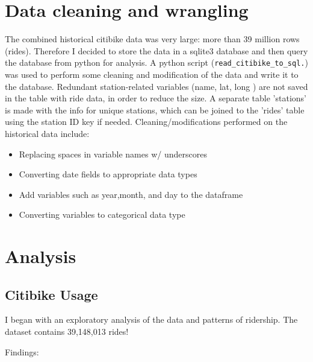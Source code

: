 \documentclass[11pt]{article}
\begin{document}
\section{Data cleaning and wrangling}

The combined historical citibike data was very large: more than 39 million rows (rides).  Therefore I decided to store the data in a sqlite3 database and then query the database from python for analysis. A python script (\verb+read_citibike_to_sql.+) was used to perform some cleaning and modification of the data and write it to the database. Redundant station-related variables (name, lat, long ) are not saved in the table with ride data, in order to reduce the size. A separate table 'stations' is made with the info for unique stations, which can be joined to the 'rides' table using the station ID key if needed. Cleaning/modifications performed on the historical data include:

\begin{itemize}
\item Replacing spaces in variable names w/ underscores
\item Converting date fields to appropriate data types
\item Add variables such as year,month, and day to the dataframe
\item Converting variables to categorical data type
\end{itemize}





\section{Analysis}



\subsection{Citibike Usage}

I began with an exploratory analysis of the data and patterns of ridership. The dataset contains 39,148,013 rides! 

Findings:
\end{document}

